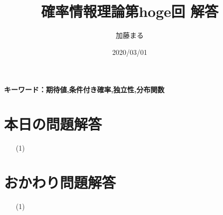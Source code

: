 \documentclass[a4j,uplatex]{jsarticle}
\title{確率情報理論第hoge回 解答}
\author{加藤まる}
\date{2020/03/01}
\begin{document}
\maketitle
\bf キーワード：期待値,条件付き確率,独立性,分布関数
\rm

\section*{本日の問題解答}
\begin{itemize}
  \item[(1)]
\end{itemize}

\section*{おかわり問題解答}
\begin{itemize}
  \item[(1)]
\end{itemize}
\end{document}
